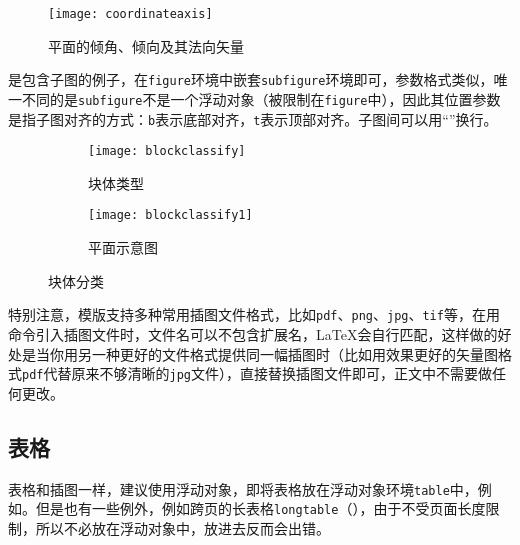 \begin{figure}[htbp]
\centering
\texttt{[image: coordinateaxis]}
\caption{平面的倾角、倾向及其法向矢量}\label{fig:samples:coordinateaxis}
\end{figure}

是包含子图的例子，在\texttt{figure}环境中嵌套\texttt{subfigure}环境即可，参数格式类似，唯一不同的是\texttt{subfigure}不是一个浮动对象（被限制在\texttt{figure}中），因此其位置参数是指子图对齐的方式：\texttt{b}表示底部对齐，\texttt{t}表示顶部对齐。子图间可以用“\ltxcmdname{\textbackslash}”换行。

\begin{figure}[htbp]
\def\figwidth{\columnwidth}
  \centering
    \begin{subfigure}[b]{0.5\figwidth} %
      \centering
      \texttt{[image: blockclassify]}
      \caption{块体类型}\label{fig:samples:blockclassify}
    \end{subfigure} %
    \begin{subfigure}[b]{0.36\figwidth}
      \centering
      \texttt{[image: blockclassify1]}
      \caption{平面示意图}\label{fig:samples:blockclassify1}
    \end{subfigure}
  \caption{块体分类}\label{fig:samples:blcfy}
\end{figure}

特别注意，模版支持多种常用插图文件格式，比如\texttt{pdf}、\texttt{png}、\texttt{jpg}、\texttt{tif}等，在用命令引入插图文件时，文件名可以不包含扩展名，\LaTeX 会自行匹配，这样做的好处是当你用另一种更好的文件格式提供同一幅插图时（比如用效果更好的矢量图格式\texttt{pdf}代替原来不够清晰的\texttt{jpg}文件），直接替换插图文件即可，正文中不需要做任何更改。

\subsection{表格}\label{sec:tab}
表格和插图一样，建议使用浮动对象，即将表格放在浮动对象环境\texttt{table}中，例如。但是也有一些例外，例如跨页的长表格\texttt{longtable}（），由于不受页面长度限制，所以不必放在浮动对象中，放进去反而会出错。

